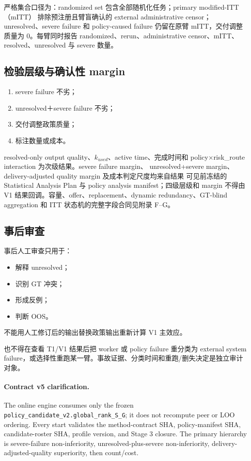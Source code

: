 严格集合口径为：randomized set 包含全部随机化任务；primary modified-ITT（mITT）
排除预注册且臂盲确认的 external administrative censor；unresolved、severe failure
和 policy-caused failure 仍留在原臂 mITT，交付调整质量为 0。每臂同时报告
randomized、rerun、administrative censor、mITT、resolved、unresolved 与 severe 数量。

\subsection{检验层级与确认性 margin}

\begin{enumerate}
  \item severe failure 不劣；
  \item unresolved＋severe failure 不劣；
  \item 交付调整政策质量；
  \item 标注数量或成本。
\end{enumerate}

resolved-only output quality、\(k_{used}\)、active time、完成时间和
policy\(\times\)risk\_route interaction 为次级结果。severe failure margin、
unresolved+severe margin、delivery-adjusted quality margin 及成本判定尺度均来自结果
可见前冻结的 Statistical Analysis Plan 与 policy analysis manifest；四级层级和 margin
不得由 V1 结果回调。容量、offer、replacement、dynamic redundancy、GT-blind aggregation
和 ITT 状态机的完整字段合同见附录 F--G。

\subsection{事后审查}

事后人工审查只用于：

\begin{itemize}
  \item 解释 unresolved；
  \item 识别 GT 冲突；
  \item 形成反例；
  \item 判断 OOS。
\end{itemize}

不能用人工修订后的输出替换政策输出重新计算 V1 主效应。

也不得在查看 T1/V1 结果后把 worker 或 policy failure 重分类为 external system failure，或选择性重跑某一臂。事故证据、分类时间和重跑/删失决定是独立审计对象。

\paragraph{Contract v5 clarification.}
The online engine consumes only the frozen \texttt{policy\_candidate\_v2.global\_rank\_S\_G}; it does not recompute peer or LOO ordering. Every start validates the method-contract SHA, policy-manifest SHA, candidate-roster SHA, profile version, and Stage 3 closure. The primary hierarchy is severe-failure non-inferiority, unresolved-plus-severe non-inferiority, delivery-adjusted-quality superiority, then count/cost.
